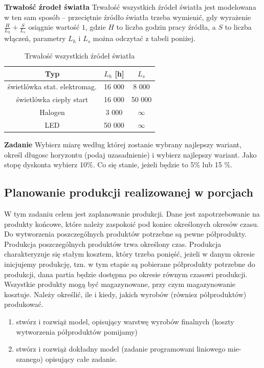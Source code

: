 \documentclass[
    12pt, %
]{../fphw}
\begin{document}
\textbf{Trwałość źrodeł światła}
Trwałość wszystkich źródeł światła jest modelowana
w ten sam sposób – przeciętnie źródło światła trzeba wymienić, gdy
wyrażenie \(\frac{H}{L_h} + \frac{S}{L_s}\)
osiągnie wartość \(1\), gdzie \(H\) to liczba godzin pracy źródła,
a \(S\) to liczba włączeń, parametry \(L_h\) i \(L_s\) można odczytać z tabeli poniżej.
\begin{table}[H]
    \centering
    \begin{tabular}{| c | c | c |}
        \hline
        Typ                          & \(L_h\) [h] & \(L_s\)       \\
        \hline
        świetlówka stat. elektromag. & 16 000      & 8 000         \\
        świetlówka ciepły start      & 16 000      & 50 000        \\
        Halogen                      & 3 000       & \( \infty  \) \\
        LED                          & 50 000      & \( \infty  \) \\
        \hline
    \end{tabular}
    \caption{Trwałość wszystkich źródeł światła}
\end{table}

\textbf{Zadanie} Wybierz miarę według której zostanie wybrany najlepszy wariant,
określ długosc horyzontu (podaj uzasadnienie) i wybierz najlepszy wariant.
Jako stopę dyskonta wybierz 10\%. Co się stanie, jeżeli będzie to 5\% lub 15
\%.

\subsection{Planowanie produkcji realizowanej w porcjach}
W tym zadaniu celem jest zaplanowanie produkcji. Dane jest zapotrzebowanie na produkty końcowe,
które należy zaspokoić pod koniec określonych okresów czasu. Do wytworzenia poszczególnych produktów potrzebne
są pewne półprodukty. Produkcja poszczególnych produktów trwa określony czas.
Produkcja charakteryzuje się stałym kosztem, który trzeba ponięść,
jeżeli w danym okresie inicjujemy produkcję, tzn. w tym etapie są pobierane
półprodukty potrzebne do produkcji, dana partia będzie dostępna po okresie
równym czasowi produkcji. Wszystkie produkty mogą być magazynowane,
przy czym magazynowanie kosztuje.
Należy określić, ile i kiedy, jakich wyrobów (równiez półproduktów) produkować.

\begin{enumerate}
    \item stwórz i rozwiąż model, opisujący warstwę wyrobów finalnych (koszty
          wytworzenia półproduktów pomijamy)
    \item stwórz i rozwiąż dokładny model (zadanie programowani liniowego mie-
          szanego) opisujący całe zadanie.
\end{enumerate}
\end{document}
